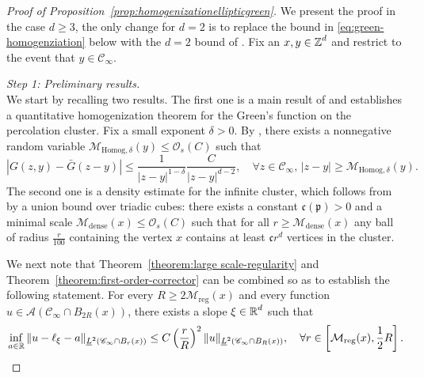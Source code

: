 \documentclass[12pt]{amsart}
\numberwithin{equation}{section}
\begin{document}
	\begin{proof}[Proof of Proposition~\ref{prop:homogenizationellipticgreen}]
		We present the proof in the case $d \geq 3$, the only change for $d = 2$ is to replace the bound in \eqref{eq:green-homogenziation} below
		with the $d=2$ bound of \cite{dario-gu-green}. Fix an $x, y \in \operatorname{\mathbb{Z}}^d$ and restrict to the event that $y \in \mathscr{C}_{\infty}$. 
		
		{\it Step 1: Preliminary results.} \\ 
		We start by recalling two results. The first one is a main result of \cite{dario-gu-green} and establishes a quantitative homogenization theorem for the Green's function on the percolation cluster. 
		Fix a small exponent $\delta > 0$. 
		By \cite[Theorem 2]{dario-gu-green}, there exists a nonnegative random variable $\mathcal{M}_{\mathrm{Homog}, \delta}(y) \leq \mathcal{O}_s(C)$ such that 
		\begin{equation} \label{eq:green-homogenziation}
			|G(z,y) - \bar{G}(z-y)|  \leq \frac{1}{|z-y|^{1-\delta}}  \frac{C}{|z-y|^{d-2}}, \quad \forall z \in \mathscr{C}_\infty, \, |z-y| \geq \mathcal{M}_{\mathrm{Homog}, \delta}(y).
		\end{equation}
		The second one is a density estimate for the infinite cluster, which follows from~\cite[Proposition A.1]{dario-gu-green} by a union bound over triadic cubes: 
		there exists a constant $\mathfrak{c}(\mathfrak{p}) > 0$ and a minimal scale $\mathcal{M}_{\mathrm{dense}}(x) \leq \mathcal{O}_s(C)$ 
		such that for all  $r \geq \mathcal{M}_{\mathrm{dense}}(x)$ any ball of radius $\frac{r}{100}$
		containing the vertex $x$ contains at least $\mathfrak{c} r^d$ vertices in the cluster. 
		
		We next note that Theorem~\ref{theorem:large scale-regularity} and Theorem~\ref{theorem:first-order-corrector} can be combined so as to establish the following statement. For every $R \geq 2 \mathcal{M}_{\mathrm{reg}}(x)$ and every function $u \in \mathcal{A}(\mathscr{C}_{\infty} \cap B_{2 R}(x))$, 
		there exists a slope $\xi \in \operatorname{\mathbb{R}}^d$ such that 
		\begin{equation} \label{eq:large scale-regularity}
			\inf_{a \in \operatorname{\mathbb{R}}} \| u - \ell_\xi  - a \|_{\underline{L}^2(\mathscr{C}_{\infty} \cap B_r(x))} \leq C \left( \frac{r}{R} \right)^2 \|u\|_{\underline{L}^2( \mathscr{C}_{\infty} \cap B_R(x))}, \quad \forall 
			r \in \left[\mathcal{M}_{\mathrm{reg}}(x), \frac{1}{2} R\right].
		\end{equation}
		

\end{proof}
\end{document}
